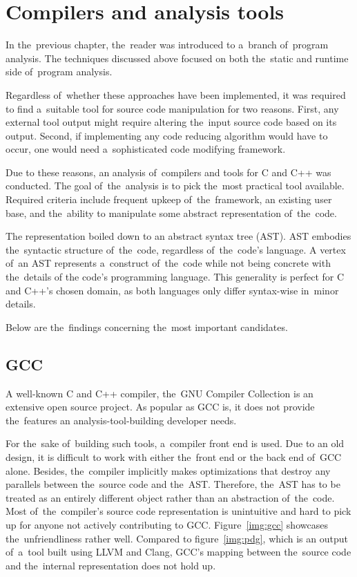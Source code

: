 \chapter{Compilers and analysis tools}\label{chap:tools}

In the~previous chapter, the~reader was introduced to a~branch of~program
ana\-ly\-sis. 
The techniques discussed above focused on both the~static and runtime
side of~program analysis. 

Regardless of~whether these approaches have been implemented, it was 
required to find a~suitable tool for source code manipulation for two reasons. 
First, any external tool output might require altering the~input source code 
based on its output. 
Second, if implementing any code reducing algorithm would have to occur, 
one would need a~sophisticated code modifying framework. 

Due to these reasons, an analysis of~compilers and tools for C and C++ was conducted. 
The goal of~the~analysis is to pick the~most practical tool available. 
Required criteria include frequent upkeep of~the~framework, 
an existing user base, and the~ability to manipulate some abstract 
representation of~the~code.

The representation boiled down to an abstract syntax tree (AST). 
AST embodies the~syntactic structure of~the~code, regardless of~the~code's language. 
A vertex of~an AST represents a~construct of~the~code while not being concrete 
with the~details of the code's programming language. 
This generality is perfect for C and C++'s chosen domain, 
as both languages only differ syntax-wise in~minor details.

Below are the~findings concerning the~most important candidates.

\section{GCC}

A well-known C and C++ compiler, the~GNU Compiler Collection \citep{gcc:online} 
is an extensive
open source project. 
As popular as GCC is, it does not provide the~features an analysis-tool-building 
developer needs. 

For the~sake of~building such tools, a~compiler front end is used. 
Due to an old design, it is difficult to work with either the~front end or 
the back end of~GCC alone. 
Besides, the~compiler implicitly makes optimizations that destroy any parallels 
between the~source code and the~AST. 
Therefore, the~AST has to be treated as an entirely different object rather than 
an abstraction of~the~code. 
Most of~the~compiler's source code representation is unintuitive and 
hard to pick up for anyone not actively contributing to GCC. 
Figure~\ref{img:gcc} showcases the~unfriendliness rather well.
Compared to figure~\ref{img:pdg}, which is an output of~a~tool built using
LLVM and Clang, GCC's mapping between the~source code and the~internal
representation does not hold up.

